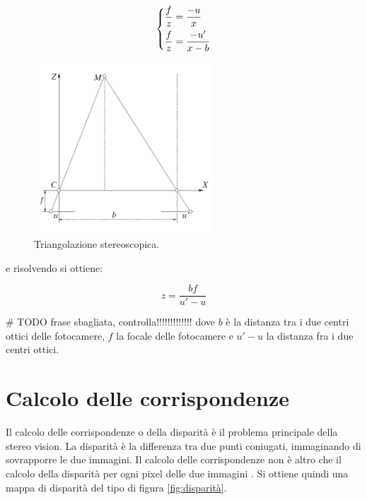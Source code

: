 \documentclass[12pt]{report}
\begin{document}
			\[
			\begin{dcases}
				\frac{f}{z}=\frac{-u}{x} \\
				\frac{f}{z}=\frac{-u'}{x-b}
			\end{dcases}
			\]
			
			\begin{figure}
				\includegraphics[width=0.6\textwidth]{./figures/Triangolazione_stereoscopica.png}
				\caption{Triangolazione stereoscopica.}
				\label{fig:triangolazione}
			\end{figure}
			
			e risolvendo si ottiene:

			\[
			z=\frac{bf}{u'-u}
			\]
			
			\# TODO frase sbagliata, controlla!!!!!!!!!!!!! \newline
			dove $b$ è la distanza tra i due centri ottici delle fotocamere, $f$ la focale delle fotocamere e $u'-u$ la distanza fra i due centri ottici.
		
		
		\section{Calcolo delle corrispondenze}
		\label{sec:corrispondenze}
		
			Il calcolo delle corrispondenze o della disparità è il problema principale della stereo vision. \newline
			La disparità è la differenza tra due punti coniugati, immaginando di sovrapporre le due immagini. Il calcolo delle corrispondenze non è altro che il calcolo della disparità per ogni pixel delle due immagini \cite{fusiello}. Si ottiene quindi una mappa di disparità del tipo di figura \ref{fig:disparità}.
			
\end{document}
